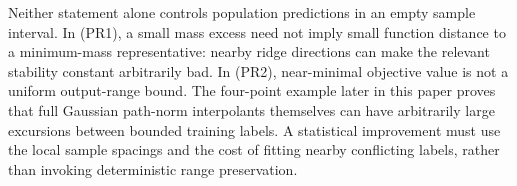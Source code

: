 Neither statement alone controls population predictions in an empty
sample interval. In (PR1), a small mass excess need not imply small
function distance to a minimum-mass representative: nearby ridge
directions can make the relevant stability constant arbitrarily bad.
In (PR2), near-minimal objective value is not a uniform output-range
bound. The four-point example later in this paper proves that
full Gaussian path-norm interpolants themselves can have arbitrarily
large excursions between bounded training labels. A statistical
improvement must use the local sample spacings and the cost of fitting
nearby conflicting labels, rather than invoking deterministic range
preservation.
